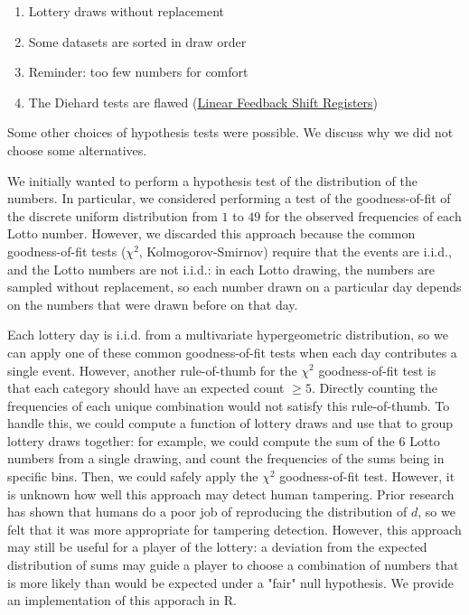\begin{enumerate}
    \item Lottery draws without replacement
    \item Some datasets are sorted in draw order
    \item Reminder: too few numbers for comfort
    \item The Diehard tests are flawed (\href{https://crypto.stackexchange.com/a/397}{Linear Feedback Shift Registers})
\end{enumerate}

Some other choices of hypothesis tests were possible. We discuss why we did not
choose some alternatives.

We initially wanted to perform a hypothesis test of the distribution of the numbers. 
In particular, we considered performing a test of the goodness-of-fit of 
the discrete uniform distribution from $1$ to $49$ for the observed frequencies
of each Lotto number. However, we discarded this approach because the common goodness-of-fit tests
($\chi^2$, Kolmogorov-Smirnov) require that the events are i.i.d., and the Lotto numbers
are not i.i.d.: in each Lotto drawing, the numbers are sampled without replacement,
so each number drawn on a particular day depends on the numbers that were drawn before
on that day.

Each lottery day is i.i.d. from a multivariate hypergeometric distribution,
so we can apply one of these common goodness-of-fit tests when each day contributes a single
event. However, another rule-of-thumb for the $\chi^2$ goodness-of-fit test is that
each category should have an expected count $\geq 5$. Directly counting the frequencies
of each unique combination would not satisfy this rule-of-thumb. To handle this, we could compute
a function of lottery draws and use that to group lottery draws together: for example,
we could compute the sum of the 6 Lotto numbers from a single drawing, and count
the frequencies of the sums being in specific bins. Then, we could safely apply the 
$\chi^2$ goodness-of-fit test. However, it is unknown how well this approach may
detect human tampering. Prior research has shown that humans do a poor job of 
reproducing the distribution of $d$, so we felt that it was more appropriate for 
tampering detection. However, this approach may still be useful for a player of the lottery:
a deviation from the expected distribution of sums may guide a player to choose
a combination of numbers that is more likely than would be expected under a "fair"
null hypothesis. We provide an implementation of this apporach in R.